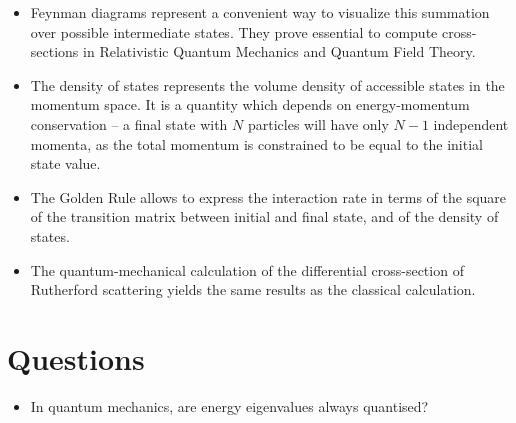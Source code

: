 \begin{itemize}
    \item Feynman diagrams represent a convenient way to visualize this summation over possible intermediate states. They prove essential to compute cross-sections in Relativistic Quantum Mechanics and Quantum Field Theory.
    \item The density of states represents the volume density of accessible states in the momentum space. It is a quantity which depends on energy-momentum conservation -- a final state with $N$ particles will have only $N-1$ independent momenta, as the total momentum is constrained to be equal to the initial state value.
    \item The Golden Rule allows to express the interaction rate in terms of the square of the transition matrix between initial and final state, and of the density of states.
    \item The quantum-mechanical calculation of the differential cross-section of Rutherford scattering yields the same results as the classical calculation.
\end{itemize}
\section*{Questions}
\begin{itemize}
    \item In quantum mechanics, are energy eigenvalues always quantised?
\end{itemize}
